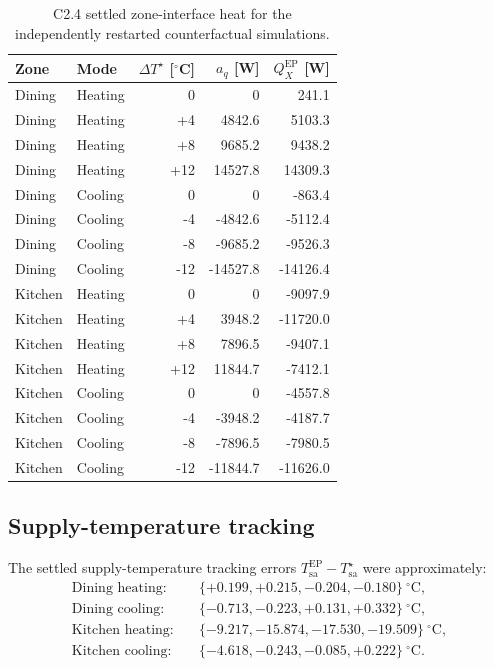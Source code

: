 \documentclass[11pt]{article}
\begin{document}
\begin{table}[htbp]
\centering
\small
\begin{tabular}{llrrr}
\toprule
Zone & Mode & $\Delta T^\star$ [$^\circ$C] &
$a_q$ [W] & $Q_X^{\mathrm{EP}}$ [W] \\
\midrule
Dining & Heating & 0 & 0 & 241.1 \\
Dining & Heating & +4 & 4842.6 & 5103.3 \\
Dining & Heating & +8 & 9685.2 & 9438.2 \\
Dining & Heating & +12 & 14527.8 & 14309.3 \\
\midrule
Dining & Cooling & 0 & 0 & -863.4 \\
Dining & Cooling & -4 & -4842.6 & -5112.4 \\
Dining & Cooling & -8 & -9685.2 & -9526.3 \\
Dining & Cooling & -12 & -14527.8 & -14126.4 \\
\midrule
Kitchen & Heating & 0 & 0 & -9097.9 \\
Kitchen & Heating & +4 & 3948.2 & -11720.0 \\
Kitchen & Heating & +8 & 7896.5 & -9407.1 \\
Kitchen & Heating & +12 & 11844.7 & -7412.1 \\
\midrule
Kitchen & Cooling & 0 & 0 & -4557.8 \\
Kitchen & Cooling & -4 & -3948.2 & -4187.7 \\
Kitchen & Cooling & -8 & -7896.5 & -7980.5 \\
Kitchen & Cooling & -12 & -11844.7 & -11626.0 \\
\bottomrule
\end{tabular}
\caption{C2.4 settled zone-interface heat for the independently restarted
counterfactual simulations.}
\label{tab:c24-points}
\end{table}

\subsection{Supply-temperature tracking}

The settled supply-temperature tracking errors
$T_{\mathrm{sa}}^{\mathrm{EP}}-T_{\mathrm{sa}}^\star$ were approximately:
\begin{align}
\text{Dining heating:}\quad
&\{+0.199,+0.215,-0.204,-0.180\}\ ^\circ\mathrm C,
\\
\text{Dining cooling:}\quad
&\{-0.713,-0.223,+0.131,+0.332\}\ ^\circ\mathrm C,
\\
\text{Kitchen heating:}\quad
&\{-9.217,-15.874,-17.530,-19.509\}\ ^\circ\mathrm C,
\\
\text{Kitchen cooling:}\quad
&\{-4.618,-0.243,-0.085,+0.222\}\ ^\circ\mathrm C.
\end{align}
\end{document}
